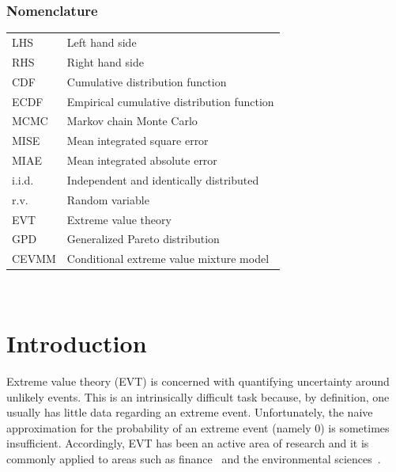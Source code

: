 \documentclass[11pt,twoside,openany]{book}
\numberwithin{Theorem}{chapter}
\numberwithin{Definition}{chapter}
\numberwithin{Lemma}{chapter}
\numberwithin{Algorithm}{chapter}
\numberwithin{equation}{chapter}
\begin{document}
\subsection*{Nomenclature}
\begin{tabular}{lp{\textwidth}}
  LHS & Left hand side \\
  RHS & Right hand side \\
  CDF & Cumulative distribution function \\
  ECDF & Empirical cumulative distribution function \\
  MCMC & Markov chain Monte Carlo \\
  MISE & Mean integrated square error \\
  MIAE & Mean integrated absolute error \\
  i.i.d.\ & Independent and identically distributed \\
  r.v.\ & Random variable \\
  EVT & Extreme value theory \\
  GPD & Generalized Pareto distribution \\
  CEVMM & Conditional extreme value mixture model
\end{tabular}\\

\clearpage

\thispagestyle{plain}
\listoftables
\clearpage

\thispagestyle{plain}
\listoffigures
\clearpage

\thispagestyle{plain}
\listofalgorithms
\clearpage

\setcounter{page}{1}





%

\cleardoublepage %

\chapter{Introduction}\label{sec.intro}

Extreme value theory (EVT) is concerned with quantifying uncertainty around
unlikely events. This is an intrinsically difficult task because,
by definition, one usually has little data regarding an extreme event.
Unfortunately, the naive approximation for the probability of an extreme
event (namely 0) is sometimes insufficient. Accordingly, EVT has been an active area
of research and it is commonly applied to areas such as
finance~\citep{embrechts1999extreme,gilli2006application,gkillas2018application} and
the environmental sciences~\citep{katz1999extreme,towler2010modeling}.
\end{document}
